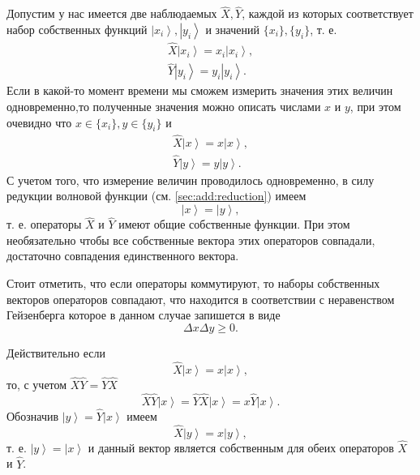 Допустим у нас имеется две наблюдаемых $\hat{X}, \hat{Y}$, каждой из
которых соответствует набор собственных функций $\left|x_i\right>,
\left|y_i\right>$ и значений $\{x_i\}, \{y_i\}$, т. е.
\begin{eqnarray}
  \hat{X}\left|x_i\right> = x_i \left|x_i\right>,
  \nonumber \\
  \hat{Y}\left|y_i\right> = y_i \left|y_i\right>.
  \nonumber
\end{eqnarray}
Если в какой-то момент времени мы сможем измерить значения этих
величин одновременно,то полученные значения можно описать числами $x$
и $y$, при этом очевидно что $x \in \{x_i\}, y \in \{y_i\}$ и
\begin{eqnarray}
  \hat{X}\left|x\right> = x \left|x\right>,
  \nonumber \\
  \hat{Y}\left|y\right> = y \left|y\right>.
  \nonumber
\end{eqnarray}
С учетом того, что измерение величин проводилось одновременно, в силу
редукции волновой функции (см. \autoref{sec:add:reduction}) имеем
\[
\left|x\right> = \left|y\right>,
\]
т. е. операторы $\hat{X}$ и $\hat{Y}$ имеют общие собственные
функции. При этом необязательно чтобы все собственные вектора этих
операторов совпадали, достаточно совпадения единственного вектора.

Стоит отметить, что если операторы коммутируют, то наборы собственных
векторов операторов совпадают, что находится в соответствии с
неравенством Гейзенберга которое в данном случае запишется в виде
\[
\Delta x \Delta y \ge 0.
\]

Действительно если
\[
\hat{X} \left|x\right> = x \left|x\right>, 
\]
то, с учетом $\hat{X}\hat{Y} = \hat{Y}\hat{X}$
\[
\hat{X}\hat{Y}\left|x\right> = 
\hat{Y}\hat{X}\left|x\right> =
x \hat{Y}\left|x\right>.
\]
Обозначив $\left|y\right> = \hat{Y}\left|x\right>$ имеем
\[
\hat{X}\left|y\right> = 
x \left|y\right>,
\]
т. е.
$\left|y\right> = \left|x\right>$ и данный вектор является собственным
для обеих операторов $\hat{X}$ и  $\hat{Y}$.
